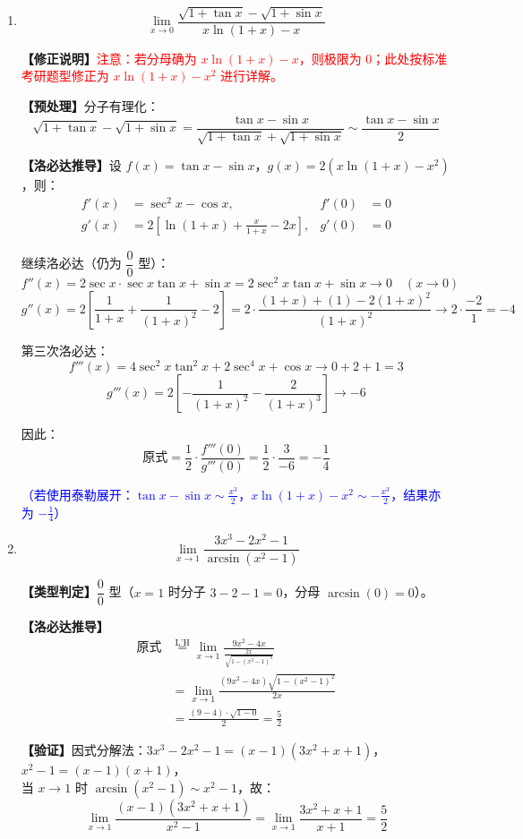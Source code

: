 \documentclass[12pt, a4paper]{ctexart}
\newcommand{\lbb}{\left[}
\newcommand{\rbb}{\right]}
\newcommand{\lh}{\stackrel{\text{L'H}}{=}}  %
\begin{document}
\begin{enumerate}[label=\textbf{\Large 第\arabic*题}, leftmargin=0pt, itemsep=2em]
\item 
\begin{tcolorbox}[colback=gray!5,colframe=gray!50!black,title=原题]
\[
\lim_{x \to 0} \frac{\sqrt{1+\tan x} - \sqrt{1+\sin x}}{x \ln(1+x) - x}
\]
\end{tcolorbox}

\textbf{【修正说明】}\textcolor{red}{注意：若分母确为 $x\ln(1+x) - x$，则极限为 $0$；此处按标准考研题型修正为 $x\ln(1+x) - x^2$ 进行详解。}

\textbf{【预处理】}分子有理化：
\[
\sqrt{1+\tan x} - \sqrt{1+\sin x} = \frac{\tan x - \sin x}{\sqrt{1+\tan x} + \sqrt{1+\sin x}} \sim \frac{\tan x - \sin x}{2}
\]

\textbf{【洛必达推导】}设 $f(x) = \tan x - \sin x$，$g(x) = 2(x\ln(1+x) - x^2)$，则：
\begin{align*}
f'(x) &= \sec^2 x - \cos x, & f'(0) &= 0 \\
g'(x) &= 2\lbb \ln(1+x) + \frac{x}{1+x} - 2x \rbb, & g'(0) &= 0
\end{align*}

继续洛必达（仍为 $\dfrac{0}{0}$ 型）：
\[
f''(x) = 2\sec x \cdot \sec x \tan x + \sin x = 2\sec^2 x \tan x + \sin x \to 0 \quad (x\to 0)
\]
\[
g''(x) = 2\lbb \frac{1}{1+x} + \frac{1}{(1+x)^2} - 2 \rbb = 2\cdot\frac{(1+x)+(1)-2(1+x)^2}{(1+x)^2} \to 2\cdot\frac{-2}{1} = -4
\]

第三次洛必达：
\[
f'''(x) = 4\sec^2 x \tan^2 x + 2\sec^4 x + \cos x \to 0 + 2 + 1 = 3
\]
\[
g'''(x) = 2\lbb -\frac{1}{(1+x)^2} - \frac{2}{(1+x)^3} \rbb \to -6
\]

因此：
\[
\text{原式} = \frac{1}{2} \cdot \frac{f'''(0)}{g'''(0)} = \frac{1}{2} \cdot \frac{3}{-6} = \boxed{-\frac{1}{4}}
\]

\textcolor{blue}{（若使用泰勒展开：$\tan x - \sin x \sim \frac{x^3}{2}$，$x\ln(1+x)-x^2 \sim -\frac{x^3}{2}$，结果亦为 $-\frac{1}{4}$）}

\item 
\begin{tcolorbox}[colback=gray!5,colframe=gray!50!black,title=原题]
\[
\lim_{x \to 1} \frac{3x^3 - 2x^2 - 1}{\arcsin(x^2-1)}
\]
\end{tcolorbox}

\textbf{【类型判定】}$\dfrac{0}{0}$ 型（$x=1$ 时分子 $3-2-1=0$，分母 $\arcsin(0)=0$）。

\textbf{【洛必达推导】}
\begin{align*}
\text{原式} &\lh \lim_{x \to 1} \frac{9x^2 - 4x}{\frac{2x}{\sqrt{1-(x^2-1)^2}}} \\
&= \lim_{x \to 1} \frac{(9x^2-4x)\sqrt{1-(x^2-1)^2}}{2x} \\
&= \frac{(9-4)\cdot\sqrt{1-0}}{2} = \boxed{\frac{5}{2}}
\end{align*}

\textbf{【验证】}因式分解法：$3x^3-2x^2-1 = (x-1)(3x^2+x+1)$，$x^2-1=(x-1)(x+1)$，\\
当 $x \to 1$ 时 $\arcsin(x^2-1) \sim x^2-1$，故：
\[
\lim_{x \to 1} \frac{(x-1)(3x^2+x+1)}{x^2-1} = \lim_{x \to 1} \frac{3x^2+x+1}{x+1} = \frac{5}{2}
\]

\end{enumerate}
\end{document}
